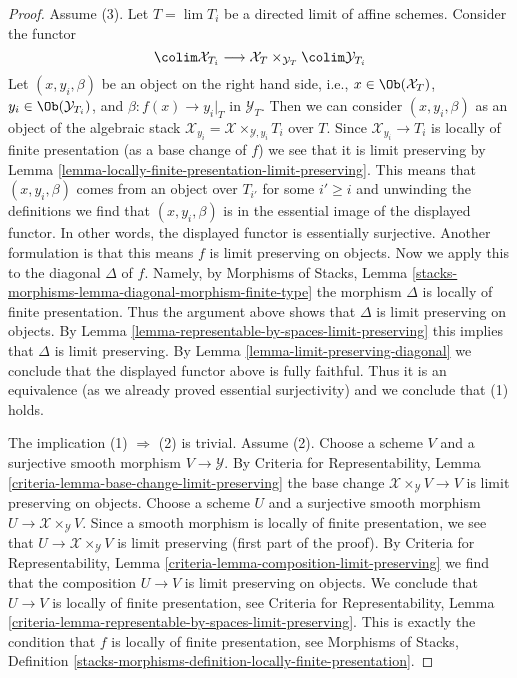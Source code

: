 \begin{proof}
Assume (3). Let $T = \lim T_i$ be a directed limit of affine schemes.
Consider the functor
$$
\colim \mathcal{X}_{T_i} \longrightarrow
\mathcal{X}_T \times_{\mathcal{Y}_T} \colim \mathcal{Y}_{T_i}
$$
Let $(x, y_i, \beta)$ be an object on the right hand side, i.e.,
$x \in \Ob(\mathcal{X}_T)$, $y_i \in \Ob(\mathcal{Y}_{T_i})$, and
$\beta : f(x) \to y_i|_T$ in $\mathcal{Y}_T$.
Then we can consider $(x, y_i, \beta)$ as an object of the
algebraic stack $\mathcal{X}_{y_i} = \mathcal{X} \times_{\mathcal{Y}, y_i} T_i$
over $T$. Since $\mathcal{X}_{y_i} \to T_i$ is locally of finite presentation
(as a base change of $f$) we see that it is limit preserving
by Lemma \ref{lemma-locally-finite-presentation-limit-preserving}.
This means that $(x, y_i, \beta)$ comes from an object over $T_{i'}$
for some $i' \geq i$ and unwinding the definitions we find that
$(x, y_i, \beta)$ is in the essential image of the displayed functor.
In other words, the displayed functor is essentially surjective.
Another formulation is that this means
$f$ is limit preserving on objects.
Now we apply this to the diagonal $\Delta$ of $f$. Namely,
by Morphisms of Stacks, Lemma
\ref{stacks-morphisms-lemma-diagonal-morphism-finite-type}
the morphism $\Delta$ is locally of finite presentation.
Thus the argument above shows that $\Delta$ is limit preserving on objects.
By Lemma \ref{lemma-representable-by-spaces-limit-preserving}
this implies that $\Delta$ is limit preserving.
By Lemma \ref{lemma-limit-preserving-diagonal}
we conclude that the displayed functor above is fully faithful.
Thus it is an equivalence (as we already proved essential surjectivity)
and we conclude that (1) holds.

\medskip\noindent
The implication (1) $\Rightarrow$ (2) is trivial. Assume (2).
Choose a scheme $V$ and a surjective smooth morphism $V \to \mathcal{Y}$.
By Criteria for Representability, Lemma
\ref{criteria-lemma-base-change-limit-preserving}
the base change $\mathcal{X} \times_\mathcal{Y} V \to V$
is limit preserving on objects.
Choose a scheme $U$ and a surjective smooth morphism
$U \to \mathcal{X} \times_\mathcal{Y} V$.
Since a smooth morphism is locally of finite presentation,
we see that $U \to \mathcal{X} \times_\mathcal{Y} V$ is
limit preserving (first part of the proof).
By Criteria for Representability, Lemma
\ref{criteria-lemma-composition-limit-preserving}
we find that the composition $U \to V$ is limit preserving
on objects. We conclude that $U \to V$ is locally of finite presentation, see
Criteria for Representability, Lemma
\ref{criteria-lemma-representable-by-spaces-limit-preserving}.
This is exactly the condition that $f$ is locally of finite presentation, see
Morphisms of Stacks, Definition
\ref{stacks-morphisms-definition-locally-finite-presentation}.
\end{proof}




